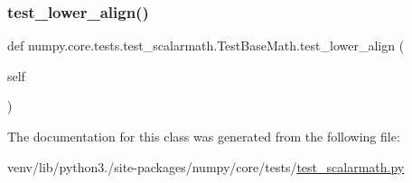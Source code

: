 \mbox{\label{classnumpy_1_1core_1_1tests_1_1test__scalarmath_1_1TestBaseMath_a40bb8860478d5af30fdf956168190d9f}} 
\subsubsection{\texorpdfstring{test\+\_\+lower\+\_\+align()}{test\_lower\_align()}}
{\footnotesize\ttfamily def numpy.\+core.\+tests.\+test\+\_\+scalarmath.\+Test\+Base\+Math.\+test\+\_\+lower\+\_\+align (\begin{DoxyParamCaption}\item[{}]{self }\end{DoxyParamCaption})}



The documentation for this class was generated from the following file\+:\begin{DoxyCompactItemize}
\item 
venv/lib/python3./site-\/packages/numpy/core/tests/\hyperlink{test__scalarmath_8py}{test\+\_\+scalarmath.\+py}\end{DoxyCompactItemize}
